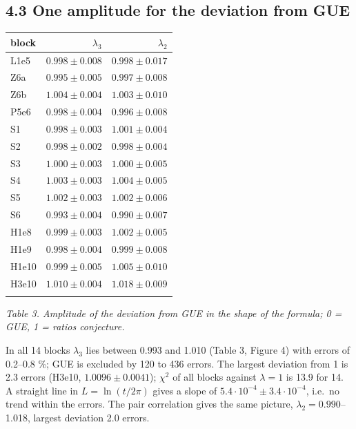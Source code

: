 \documentclass[
  10pt,
]{article}
\begin{document}
\hypertarget{one-amplitude-for-the-deviation-from-gue}{%
\subsection{4.3 One amplitude for the deviation from
GUE}\label{one-amplitude-for-the-deviation-from-gue}}

{\small\begin{longtable}[]{@{}lrr@{}}
\toprule\noalign{}
block & \(\lambda_3\) & \(\lambda_2\) \\
\midrule\noalign{}
\endhead
\bottomrule\noalign{}
\endlastfoot
L1e5 & \(0.998 \pm 0.008\) & \(0.998 \pm 0.017\) \\ \addlinespace[2pt]
Z6a & \(0.995 \pm 0.005\) & \(0.997 \pm 0.008\) \\ \addlinespace[2pt]
Z6b & \(1.004 \pm 0.004\) & \(1.003 \pm 0.010\) \\ \addlinespace[2pt]
P5e6 & \(0.998 \pm 0.004\) & \(0.996 \pm 0.008\) \\ \addlinespace[2pt]
S1 & \(0.998 \pm 0.003\) & \(1.001 \pm 0.004\) \\ \addlinespace[2pt]
S2 & \(0.998 \pm 0.002\) & \(0.998 \pm 0.004\) \\ \addlinespace[2pt]
S3 & \(1.000 \pm 0.003\) & \(1.000 \pm 0.005\) \\ \addlinespace[2pt]
S4 & \(1.003 \pm 0.003\) & \(1.004 \pm 0.005\) \\ \addlinespace[2pt]
S5 & \(1.002 \pm 0.003\) & \(1.002 \pm 0.006\) \\ \addlinespace[2pt]
S6 & \(0.993 \pm 0.004\) & \(0.990 \pm 0.007\) \\ \addlinespace[2pt]
H1e8 & \(0.999 \pm 0.003\) & \(1.002 \pm 0.005\) \\ \addlinespace[2pt]
H1e9 & \(0.998 \pm 0.004\) & \(0.999 \pm 0.008\) \\ \addlinespace[2pt]
H1e10 & \(0.999 \pm 0.005\) & \(1.005 \pm 0.010\) \\ \addlinespace[2pt]
H3e10 & \(1.010 \pm 0.004\) & \(1.018 \pm 0.009\) \\ \addlinespace[2pt]
\end{longtable}}

\emph{Table 3. Amplitude of the deviation from GUE in the shape of the
formula; 0 = GUE, 1 = ratios conjecture.}

In all 14 blocks \(\lambda_3\) lies between 0.993 and 1.010 (Table 3,
Figure 4) with errors of 0.2--0.8 \%; GUE is excluded by 120 to 436
errors. The largest deviation from 1 is 2.3 errors (H3e10,
\(1.0096 \pm 0.0041\)); \(\chi^2\) of all blocks against \(\lambda = 1\)
is 13.9 for 14. A straight line in \(L = \ln(t/2\pi)\) gives a slope of
\(5.4\cdot10^{-4} \pm 3.4\cdot10^{-4}\), i.e.~no trend within the
errors. The pair correlation gives the same picture,
\(\lambda_2 = 0.990\)--1.018, largest deviation 2.0 errors.
\end{document}
